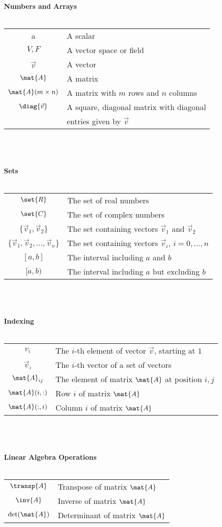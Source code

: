 \begin{center}
    \textbf{\large Numbers and Arrays} \\~\\
    \begin{tabular}{cl}
        a & A scalar \\
        $V, F$ & A vector space or field \\
        $\vec{v}$ & A vector \\
        $\mat{A}$ & A matrix \\
        $\mat{A}(m \times n)$ & A matrix with $m$ rows and $n$ columns \\
        $\diag{\vec{v}}$ & A square, diagonal matrix with diagonal \\ ~ & entries given by $\vec{v}$
    \end{tabular}
    \\~\\~\\
    \textbf{\large Sets} \\~\\
    \begin{tabular}{cl}
        $\set{R}$ & The set of real numbers \\
        $\set{C}$ & The set of complex numbers \\
        $\{\vec{v}_1, \vec{v}_2\}$ & The set containing vectors $\vec{v}_1$ and $\vec{v}_2$ \\
        $\{\vec{v}_1, \vec{v}_2, \hdots, \vec{v}_n\}$ & The set containing vectors $\vec{v}_i$, $i = 0, \hdots, n$ \\
        $[a,b]$ & The interval including $a$ and $b$ \\
        $[a,b)$ & The interval including $a$ but excluding $b$
    \end{tabular}
    \\~\\~\\
    \textbf{\large Indexing} \\~\\
    \begin{tabular}{cl}
        $v_i$ & The $i$-th element of vector $\vec{v}$, starting at $1$ \\
        $\vec{v}_i$ & The $i$-th vector of a set of vectors \\
        $\mat{A}_{ij}$ & The element of matrix $\mat{A}$ at position $i, j$ \\
        $\mat{A}(i,:)$ & Row $i$ of matrix $\mat{A}$ \\
        $\mat{A}(:,i)$ & Column $i$ of matrix $\mat{A}$
    \end{tabular}
    \\~\\~\\
    \textbf{\large Linear Algebra Operations} \\~\\
    \begin{tabular}{cl}
        $\transp{A}$ & Transpose of matrix $\mat{A}$ \\
        $\inv{A}$ & Inverse of matrix $\mat{A}$ \\
        $\det(\mat{A})$ & Determinant of matrix $\mat{A}$
    \end{tabular}
\end{center}